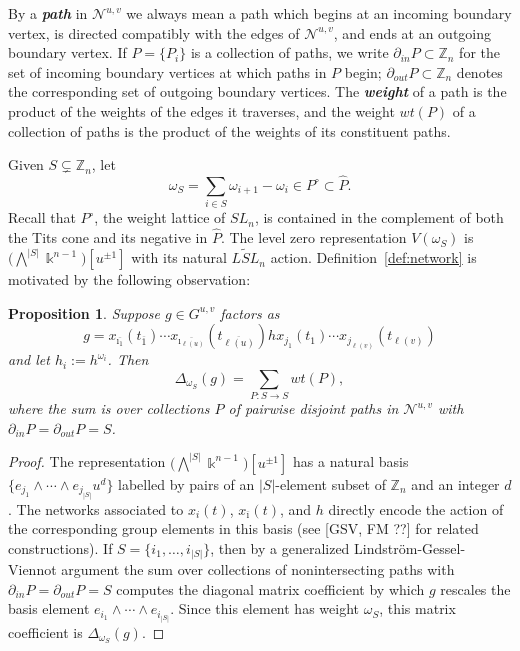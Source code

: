 \documentclass[12pt]{amsart}
\newcommand{\newword}[1]{\textbf{\emph{#1}}}
\newcommand{\ZZ}{\mathbb{Z}}
\newcommand{\kk}{\Bbbk}
\newcommand{\cN}{\mathcal{N}} %
\newcommand{\ol}[1]{\overline{#1}}
\newcommand{\loopvar}{u}
\newtheorem{proposition}[theorem]{Proposition}
\theoremstyle{remark}
\numberwithin{equation}{section}
\numberwithin{figure}{section}
\begin{document}
By a \newword{path} in $\cN^{u,v}$ we always mean a path which begins at an incoming boundary vertex, is directed compatibly with the edges of $\cN^{u,v}$, and ends at an outgoing boundary vertex.
If $P = \{P_i\}$ is a collection of paths, we write $\partial_{in}P \subset \ZZ_n$ for the set of incoming boundary vertices at which paths in $P$ begin; $\partial_{out}P \subset \ZZ_n$ denotes the corresponding set of outgoing boundary vertices.
The \newword{weight} of a path is the product of the weights of the edges it traverses, and the weight $wt(P)$ of a collection of paths is the product of the weights of its constituent paths.

Given $S \subsetneq \ZZ_n$, let
\[ 
  \omega_S 
  = 
  \sum_{i \in S} \omega_{i+1} - \omega_i \in P^\circ \subset \widehat{P}.
\] 
Recall that $P^\circ$, the weight lattice of $SL_n$, is contained in the complement of both the Tits cone and its negative in $\widehat{P}$.
The level zero representation $V(\omega_S)$ is $\big(\bigwedge^{|S|}\kk^{n-1}\big)[\loopvar^{\pm 1}]$ with its natural $\widetilde{LSL}_n$ action.
Definition~\ref{def:network} is motivated by the following observation:

\begin{proposition}
  \label{prop:minorsfrompaths}
  Suppose $g\in G^{u,v}$ factors as
  \[
  g = x_{\ol{\imath_1}}(t_{\ol{1}})\cdots x_{\ol{\imath_{\ell(u)}}}(t_{\ol{\ell(u)}})hx_{j_1}(t_{1}) \cdots x_{j_{\ell(v)}}(t_{\ell(v)})
  \]
  and let $h_i:= h^{\omega_i}$.
  Then 
  \[ 
    \Delta_{\omega_S}(g) = \sum_{P: S \to S} wt(P), 
  \]
  where the sum is over collections $P$ of pairwise disjoint paths in $\cN^{u,v}$ with $\partial_{in}P = \partial_{out}P = S$.
\end{proposition}
\begin{proof}
  The representation $\big(\bigwedge^{|S|}\kk^{n-1}\big)[\loopvar^{\pm 1}]$ has a natural basis $\{ e_{j_1} \wedge \cdots \wedge e_{j_{|S|}} \loopvar^d\}$ labelled by pairs of an $|S|$-element subset of $\ZZ_n$ and an integer $d$.
  The networks associated to $x_i(t)$, $x_{\ol{\imath}}(t)$, and $h$ directly encode the action of the corresponding group elements in this basis (see [GSV, FM ??] for related constructions).
  If $S = \{i_1,\dotsc,i_{|S|}\}$, then by a generalized Lindstr\"om-Gessel-Viennot argument the sum over collections of nonintersecting paths with $\partial_{in}P = \partial_{out}P = S$ computes the diagonal matrix coefficient by which $g$ rescales the basis element $e_{i_1} \wedge \cdots \wedge e_{i_{|S|}}$.
  Since this element has weight $\omega_S$, this matrix coefficient is $\Delta_{\omega_S}(g)$.
\end{proof}
\end{document}
